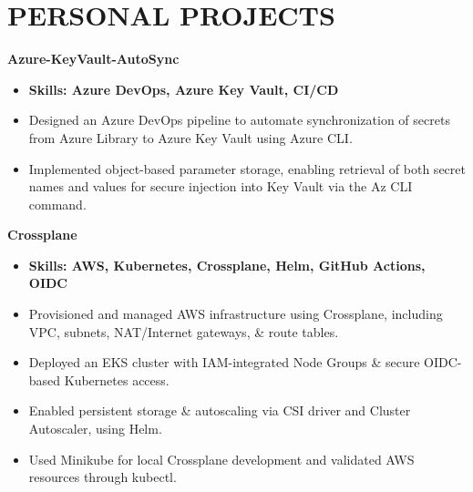 \documentclass[11pt,a4paper]{article}
\newenvironment{dashlist}{
  \begin{itemize}[label={--}]
}{
  \end{itemize}
}
\begin{document}
\section*{PERSONAL PROJECTS}
\noindent\textbf{Azure-KeyVault-AutoSync}
\begin{itemize}
\item \textbf{Skills: Azure DevOps, Azure Key Vault, CI/CD}
\end{itemize}
\begin{dashlist}
    \item Designed an Azure DevOps pipeline to automate synchronization of secrets from Azure Library to Azure Key Vault using Azure CLI.
    \item Implemented object-based parameter storage, enabling retrieval of both secret names and values for secure injection into Key Vault via the Az CLI command.
\end{dashlist}
\vspace{0.5em}

\noindent\textbf{Crossplane}
\begin{itemize}
\item \textbf{Skills: AWS, Kubernetes, Crossplane, Helm, GitHub Actions, OIDC}
\end{itemize}
\begin{dashlist}
    \item Provisioned and managed AWS infrastructure using Crossplane, including VPC, subnets, NAT/Internet gateways, \& route tables.
    \item Deployed an EKS cluster with IAM-integrated Node Groups \& secure OIDC-based Kubernetes access.
    \item Enabled persistent storage \& autoscaling via CSI driver and Cluster Autoscaler, using Helm.
    \item Used Minikube for local Crossplane development and validated AWS resources through kubectl.    
\end{dashlist}
\vspace{0.5em}
\end{document}
